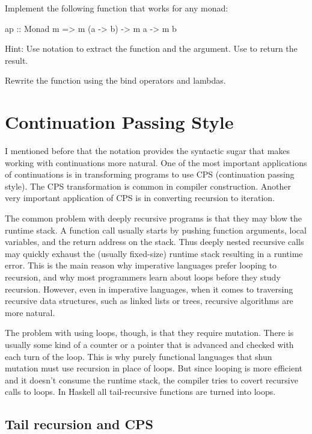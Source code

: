 \documentclass[DaoFP]{subfiles}
\begin{document}
\begin{exercise}
Implement the following function that works for any monad:
\begin{haskell}
ap :: Monad m => m (a -> b) -> m a -> m b
\end{haskell}
Hint: Use  notation to extract the function and the argument. Use  to return the result.
\end{exercise}

\begin{exercise}
Rewrite the  function using the bind operators and lambdas.
\end{exercise}

\section{Continuation Passing Style}

I mentioned before that the  notation provides the syntactic sugar that makes working with continuations more natural. One of the most important applications of continuations is in transforming programs to use CPS (continuation passing style). The CPS transformation is common in compiler construction. Another very important application of CPS is in converting recursion to iteration. 

The common problem with deeply recursive programs is that they may blow the runtime stack. A function call usually starts by pushing function arguments, local variables, and the return address on the stack. Thus deeply nested recursive calls may quickly exhaust the (usually fixed-size) runtime stack resulting in a runtime error. This is the main reason why imperative languages prefer looping to recursion, and why most programmers learn about loops before they study recursion. However, even in imperative languages, when it comes to traversing recursive data structures, such as linked lists or trees, recursive algorithms are more natural.

The problem with using loops, though, is that they require mutation. There is usually some kind of a counter or a pointer that is advanced and checked with each turn of the loop. This is why purely functional languages that shun mutation must use recursion in place of loops. But since looping is more efficient and it doesn't consume the runtime stack, the compiler tries to covert recursive calls to loops. In Haskell all tail-recursive functions are turned into loops. 

\subsection{Tail recursion and CPS}
\end{document}
